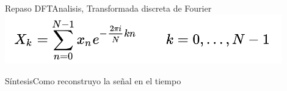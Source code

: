  \begin{frame}{Repaso DFT}{Analisis, Transformada discreta de Fourier}
    \center\includegraphics[width=0.9\textwidth]{3_clase/dft_eq}
    \vfill
 \end{frame}

\begin{frame}{Síntesis}{Como reconstruyo la señal en el tiempo}
   \handsonicon
   \begin{columns}[c]
      \hspace{2pt}
      \begin{column}{.5\textwidth}
         
      \end{column}
      \hspace{2pt}
      \vrule
      \hspace{2pt}
      \begin{column}{.5\textwidth}
         
      \end{column}
   \end{columns}
   \vfill
\end{frame}
